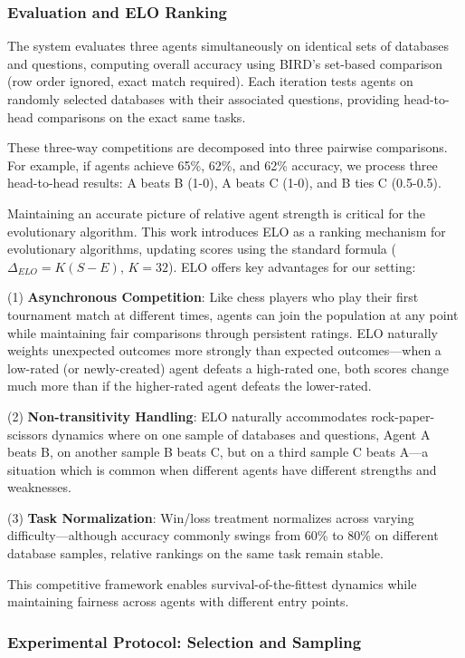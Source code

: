 \documentclass{article}
\begin{document}
\subsubsection{Evaluation and ELO Ranking}
\label{subsubsec:elo}

The system evaluates three agents simultaneously on identical sets of databases and questions, computing overall accuracy using BIRD's set-based comparison (row order ignored, exact match required). Each iteration tests agents on randomly selected databases with their associated questions, providing head-to-head comparisons on the exact same tasks.

These three-way competitions are decomposed into three pairwise comparisons. For example, if agents achieve 65\%, 62\%, and 62\% accuracy, we process three head-to-head results: A beats B (1-0), A beats C (1-0), and B ties C (0.5-0.5).

Maintaining an accurate picture of relative agent strength is critical for the evolutionary algorithm. This work introduces ELO as a ranking mechanism for evolutionary algorithms, updating scores using the standard formula ($\Delta_{ELO} = K(S - E)$, $K=32$). ELO offers key advantages for our setting:

(1) \textbf{Asynchronous Competition}: Like chess players who play their first tournament match at different times, agents can join the population at any point while maintaining fair comparisons through persistent ratings. ELO naturally weights unexpected outcomes more strongly than expected outcomes—when a low-rated (or newly-created) agent defeats a high-rated one, both scores change much more than if the higher-rated agent defeats the lower-rated.

(2) \textbf{Non-transitivity Handling}: ELO naturally accommodates rock-paper-scissors dynamics where on one sample of databases and questions, Agent A beats B, on another sample B beats C, but on a third sample C beats A—a situation which is common when different agents have different strengths and weaknesses.  

(3) \textbf{Task Normalization}: Win/loss treatment normalizes across varying difficulty—although accuracy commonly swings from 60\% to 80\% on different database samples, relative rankings on the same task remain stable.

This competitive framework enables survival-of-the-fittest dynamics while maintaining fairness across agents with different entry points.

\subsubsection{Experimental Protocol: Selection and Sampling}
\end{document}
